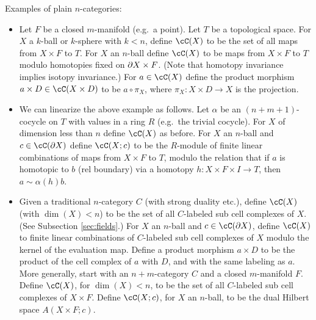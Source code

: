 
\medskip


Examples of plain $n$-categories:
\begin{itemize}

\item Let $F$ be a closed $m$-manifold (e.g.\ a point).
Let $T$ be a topological space.
For $X$ a $k$-ball or $k$-sphere with $k < n$, define $\cC(X)$ to be the set of 
all maps from $X\times F$ to $T$.
For $X$ an $n$-ball define $\cC(X)$ to be maps from $X\times F$ to $T$ modulo
homotopies fixed on $\partial X \times F$.
(Note that homotopy invariance implies isotopy invariance.)
For $a\in \cC(X)$ define the product morphism $a\times D \in \cC(X\times D)$ to
be $a\circ\pi_X$, where $\pi_X : X\times D \to X$ is the projection.

\item We can linearize the above example as follows.
Let $\alpha$ be an $(n{+}m{+}1)$-cocycle on $T$ with values in a ring $R$
(e.g.\ the trivial cocycle).
For $X$ of dimension less than $n$ define $\cC(X)$ as before.
For $X$ an $n$-ball and $c\in \cC(\bd X)$ define $\cC(X; c)$ to be
the $R$-module of finite linear combinations of maps from $X\times F$ to $T$,
modulo the relation that if $a$ is homotopic to $b$ (rel boundary) via a homotopy
$h: X\times F\times I \to T$, then $a \sim \alpha(h)b$.

\item Given a traditional $n$-category $C$ (with strong duality etc.),
define $\cC(X)$ (with $\dim(X) < n$) 
to be the set of all $C$-labeled sub cell complexes of $X$.
(See Subsection \ref{sec:fields}.)
For $X$ an $n$-ball and $c\in \cC(\bd X)$, define $\cC(X)$ to finite linear
combinations of $C$-labeled sub cell complexes of $X$
modulo the kernel of the evaluation map.
Define a product morphism $a\times D$ to be the product of the cell complex of $a$ with $D$,
and with the same labeling as $a$.
More generally, start with an $n{+}m$-category $C$ and a closed $m$-manifold $F$.
Define $\cC(X)$, for $\dim(X) < n$,
to be the set of all $C$-labeled sub cell complexes of $X\times F$.
Define $\cC(X; c)$, for $X$ an $n$-ball,
to be the dual Hilbert space $A(X\times F; c)$.


\end{itemize}
